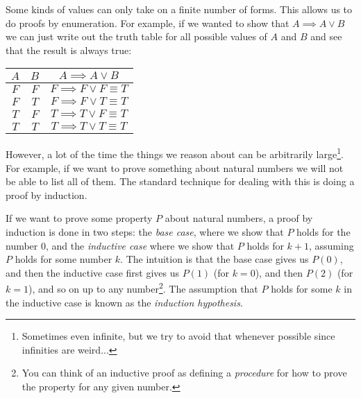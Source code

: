 \documentclass{tufte-handout}
\newcounter{example}
\begin{document}
Some kinds of values can only take on a finite number of forms.
This allows us to do proofs by enumeration. For example, if we
wanted to show that $A \implies A \lor B$ we can just write out
the truth table for all possible values of $A$ and $B$ and see
that the result is always true:

\begin{tabular}{ccc}
  $A$&$B$&$A \implies A \lor B$\\
  \hline
  $F$ & $F$ & $F \implies F \lor F \equiv T$\\
  $F$ & $T$ & $F \implies F \lor T \equiv T$\\
  $T$ & $F$ & $T \implies T \lor F \equiv T$\\
  $T$ & $T$ & $T \implies T \lor T \equiv T$\\
\end{tabular}

However, a lot of the time the things we reason about can be
arbitrarily large\footnote{Sometimes even infinite, but we try to
  avoid that whenever possible since infinities are weird...}. For
example, if we want to prove something about natural numbers we
will not be able to list all of them. The standard technique for
dealing with this is doing a proof by induction.

If we want to prove some property $P$ about natural numbers, a
proof by induction is done in two steps: the \emph{base case},
where we show that $P$ holds for the number $0$, and the
\emph{inductive case} where we show that $P$ holds for $k + 1$,
assuming $P$ holds for some number $k$.
%
The intuition is that the base case gives us $P(0)$, and then the
inductive case first gives us $P(1)$ (for $k = 0$), and then
$P(2)$ (for $k = 1$), and so on up to any number\footnote{You can
  think of an inductive proof as defining a \emph{procedure} for
  how to prove the property for any given number.}.
%
The assumption that $P$ holds for some $k$ in the inductive case
is known as the \emph{induction hypothesis}.
\end{document}
